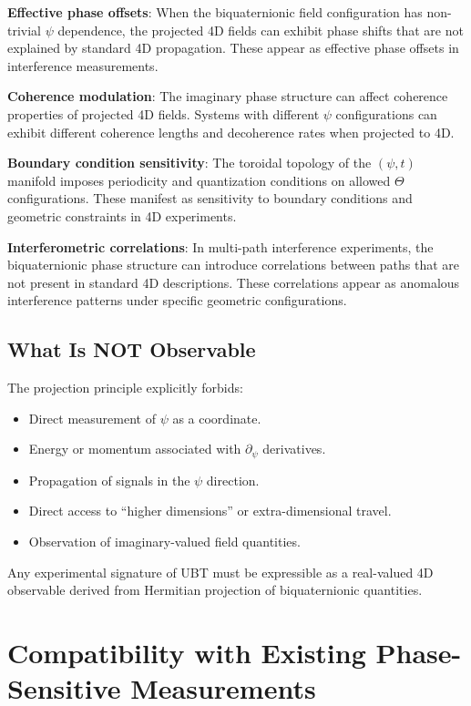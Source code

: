 \documentclass[12pt]{article}
\begin{document}
\textbf{Effective phase offsets}: When the biquaternionic field configuration has non-trivial $\psi$ dependence, the projected 4D fields can exhibit phase shifts that are not explained by standard 4D propagation. These appear as effective phase offsets in interference measurements.

\textbf{Coherence modulation}: The imaginary phase structure can affect coherence properties of projected 4D fields. Systems with different $\psi$ configurations can exhibit different coherence lengths and decoherence rates when projected to 4D.

\textbf{Boundary condition sensitivity}: The toroidal topology of the $(\psi, t)$ manifold imposes periodicity and quantization conditions on allowed $\Theta$ configurations. These manifest as sensitivity to boundary conditions and geometric constraints in 4D experiments.

\textbf{Interferometric correlations}: In multi-path interference experiments, the biquaternionic phase structure can introduce correlations between paths that are not present in standard 4D descriptions. These correlations appear as anomalous interference patterns under specific geometric configurations.

\subsection{What Is NOT Observable}

The projection principle explicitly forbids:
\begin{itemize}
\item Direct measurement of $\psi$ as a coordinate.
\item Energy or momentum associated with $\partial_\psi$ derivatives.
\item Propagation of signals in the $\psi$ direction.
\item Direct access to ``higher dimensions'' or extra-dimensional travel.
\item Observation of imaginary-valued field quantities.
\end{itemize}

Any experimental signature of UBT must be expressible as a real-valued 4D observable derived from Hermitian projection of biquaternionic quantities.

\section{Compatibility with Existing Phase-Sensitive Measurements}
\end{document}
